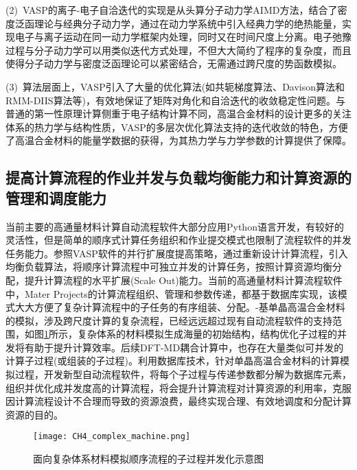 (2)~\textrm{VASP}的离子-电子自洽迭代的实现是从头算分子动力学\textrm{AIMD}方法，结合了密度泛函理论与经典分子动力学，通过在动力学系统中引入经典力学的绝热能量，实现电子与离子运动在同一动力学框架内处理，同时又在时间尺度上分离。电子弛豫过程与分子动力学可以用类似迭代方式处理，不但大大简约了程序的复杂度，而且使得分子动力学与密度泛函理论可以紧密结合，无需通过跨尺度的势函数模拟。

(3)~算法层面上，\textrm{VASP}引入了大量的优化算法(如共轭梯度算法、\textrm{Davison}算法和\textrm{RMM-DIIS}算法等)，有效地保证了矩阵对角化和自洽迭代的收敛稳定性问题。与普通的第一性原理计算侧重于电子结构计算不同，高温合金材料的设计更多的关注体系的热力学与结构性质，\textrm{VASP}的多层次优化算法支持的迭代收敛的特色，方便了高温合金材料的能量学数据的获得，为其热力学与力学参数的计算提供了保障。

\subsection{提高计算流程的作业并发与负载均衡能力和计算资源的管理和调度能力}
当前主要的高通量材料计算自动流程软件大部分应用\textrm{Python}语言开发，有较好的灵活性，但是简单的顺序式计算任务组织和作业提交模式也限制了流程软件的并发任务能力。参照\textrm{VASP}软件的并行扩展度提高策略，通过重新设计计算流程，引入均衡负载算法，将顺序计算流程中可独立并发的计算任务，按照计算资源均衡分配，提升计算流程的水平扩展\textrm{(Scale Out)}能力。当前的高通量材料计算流程软件中，\textrm{Mater Projects}的计算流程组织、管理和参数传递，都基于数据库实现，该模式大大方便了复杂计算流程中的子任务的有序组装、分配。-基单晶高温合金材料的模拟，涉及跨尺度计算的复杂流程，已经远远超过现有自动流程软件的支持范围，如图\ref{CH4_comp_BCC}所示，复杂体系的材料模拟生成海量的初始结构，结构优化子过程的并发将有助于提升计算效率。后续\textrm{DFT-MD}耦合计算中，也存在大量类似可并发的计算子过程(或组装的子过程)。利用数据库技术，针对单晶高温合金材料的计算模拟过程，开发新型自动流程软件，将每个子过程与传递参数都分解为数据库元素，组织并优化成并发度高的计算流程，将会提升计算流程对计算资源的利用率，克服因计算流程设计不合理而导致的资源浪费，最终实现合理、有效地调度和分配计算资源的目的。
\begin{figure}[h!]
\centering
\vskip -2pt
\texttt{[image: CH4\_complex\_machine.png]}
\caption{面向复杂体系材料模拟顺序流程的子过程并发化示意图}%
\label{CH4_comp_BCC}
\end{figure}
